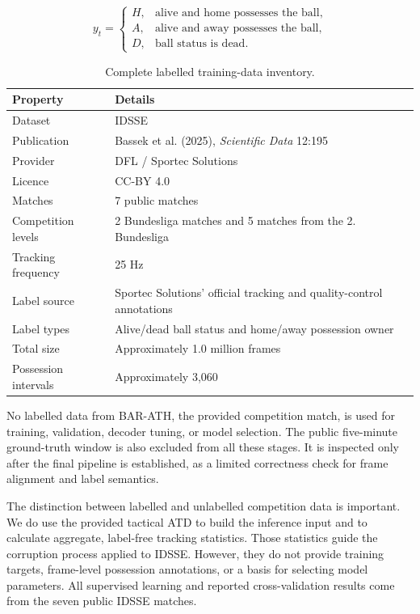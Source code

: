 \documentclass[11pt,a4paper]{article}
\begin{document}
\[
y_t =
\begin{cases}
H, & \text{alive and home possesses the ball},\\
A, & \text{alive and away possesses the ball},\\
D, & \text{ball status is dead}.
\end{cases}
\]

\begin{table}[H]
\centering
\small
\caption{Complete labelled training-data inventory.}

\begin{tabularx}{\textwidth}{L{0.25\textwidth} Y}
\toprule
\textbf{Property} & \textbf{Details} \\
\midrule
Dataset & IDSSE \\
Publication & Bassek et al. (2025), \textit{Scientific Data} 12:195 \\
Provider & DFL / Sportec Solutions \\
Licence & CC-BY 4.0 \\
Matches & 7 public matches \\
Competition levels & 2 Bundesliga matches and 5 matches from the 2. Bundesliga \\
Tracking frequency & 25 Hz \\
Label source & Sportec Solutions' official tracking and quality-control annotations \\
Label types & Alive/dead ball status and home/away possession owner \\
Total size & Approximately 1.0 million frames \\
Possession intervals & Approximately 3,060 \\
\bottomrule
\end{tabularx}
\end{table}

No labelled data from BAR-ATH, the provided competition match, is used for training, validation, decoder tuning, or model selection. The public five-minute ground-truth window is also excluded from all these stages. It is inspected only after the final pipeline is established, as a limited correctness check for frame alignment and label semantics.

The distinction between labelled and unlabelled competition data is important. We do use the provided tactical ATD to build the inference input and to calculate aggregate, label-free tracking statistics. Those statistics guide the corruption process applied to IDSSE. However, they do not provide training targets, frame-level possession annotations, or a basis for selecting model parameters. All supervised learning and reported cross-validation results come from the seven public IDSSE matches.
\end{document}
